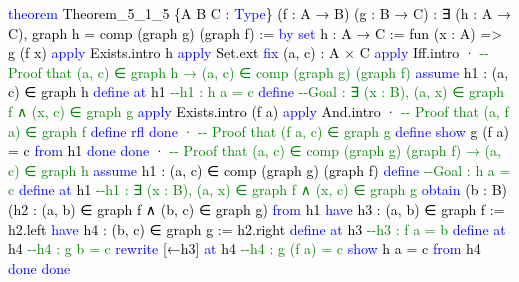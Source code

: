 \documentclass[
  letterpaper,
  DIV=11,
  numbers=noendperiod]{scrreprt}
\newenvironment{Shaded}{\begin{snugshade}}{\end{snugshade}}
\newcommand{\CommentTok}[1]{\textcolor[rgb]{0.37,0.37,0.37}{#1}}
\newcommand{\KeywordTok}[1]{\textcolor[rgb]{0.00,0.23,0.31}{#1}}
\newcommand{\NormalTok}[1]{\textcolor[rgb]{0.00,0.23,0.31}{#1}}
\renewcommand{\NormalTok}[1]{\textcolor[HTML]{000000}{#1}}
\renewcommand{\KeywordTok}[1]{\textcolor[HTML]{0000FF}{#1}}
\renewcommand{\CommentTok}[1]{\textcolor[HTML]{008000}{#1}}
\theoremstyle{remark}
\begin{document}
\begin{Shaded}
\begin{Highlighting}[]
\KeywordTok{theorem}\NormalTok{ Theorem\_5\_1\_5 \{A B C : }\KeywordTok{Type}\NormalTok{\} (f : A → B) (g : B → C) :}
\NormalTok{    ∃ (h : A → C), graph h = comp (graph g) (graph f) := }\KeywordTok{by}
  \KeywordTok{set}\NormalTok{ h : A → C := fun (x : A) =\textgreater{} g (f x)}
  \KeywordTok{apply}\NormalTok{ Exists.intro h}
  \KeywordTok{apply}\NormalTok{ Set.ext}
  \KeywordTok{fix}\NormalTok{ (a, c) : A × C}
  \KeywordTok{apply}\NormalTok{ Iff.intro}
\NormalTok{  · }\CommentTok{{-}{-} Proof that (a, c) ∈ graph h → (a, c) ∈ comp (graph g) (graph f)}
    \KeywordTok{assume}\NormalTok{ h1 : (a, c) ∈ graph h}
    \KeywordTok{define} \KeywordTok{at}\NormalTok{ h1  }\CommentTok{{-}{-}h1 : h a = c}
    \KeywordTok{define}        \CommentTok{{-}{-}Goal : ∃ (x : B), (a, x) ∈ graph f ∧ (x, c) ∈ graph g}
    \KeywordTok{apply}\NormalTok{ Exists.intro (f a)}
    \KeywordTok{apply}\NormalTok{ And.intro}
\NormalTok{    · }\CommentTok{{-}{-} Proof that (a, f a) ∈ graph f}
      \KeywordTok{define}
      \KeywordTok{rfl}
      \KeywordTok{done}
\NormalTok{    · }\CommentTok{{-}{-} Proof that (f a, c) ∈ graph g}
      \KeywordTok{define}
      \KeywordTok{show}\NormalTok{ g (f a) = c }\KeywordTok{from}\NormalTok{ h1}
      \KeywordTok{done}
    \KeywordTok{done}
\NormalTok{  · }\CommentTok{{-}{-} Proof that (a, c) ∈ comp (graph g) (graph f) → (a, c) ∈ graph h}
    \KeywordTok{assume}\NormalTok{ h1 : (a, c) ∈ comp (graph g) (graph f)}
    \KeywordTok{define}        \CommentTok{{-}{-}Goal : h a = c}
    \KeywordTok{define} \KeywordTok{at}\NormalTok{ h1  }\CommentTok{{-}{-}h1 : ∃ (x : B), (a, x) ∈ graph f ∧ (x, c) ∈ graph g}
    \KeywordTok{obtain}\NormalTok{ (b : B) (h2 : (a, b) ∈ graph f ∧ (b, c) ∈ graph g) }\KeywordTok{from}\NormalTok{ h1}
    \KeywordTok{have}\NormalTok{ h3 : (a, b) ∈ graph f := h2.left}
    \KeywordTok{have}\NormalTok{ h4 : (b, c) ∈ graph g := h2.right}
    \KeywordTok{define} \KeywordTok{at}\NormalTok{ h3          }\CommentTok{{-}{-}h3 : f a = b}
    \KeywordTok{define} \KeywordTok{at}\NormalTok{ h4          }\CommentTok{{-}{-}h4 : g b = c}
    \KeywordTok{rewrite}\NormalTok{ [←h3] }\KeywordTok{at}\NormalTok{ h4   }\CommentTok{{-}{-}h4 : g (f a) = c}
    \KeywordTok{show}\NormalTok{ h a = c }\KeywordTok{from}\NormalTok{ h4}
    \KeywordTok{done}
  \KeywordTok{done}
\end{Highlighting}
\end{Shaded}
\end{document}
